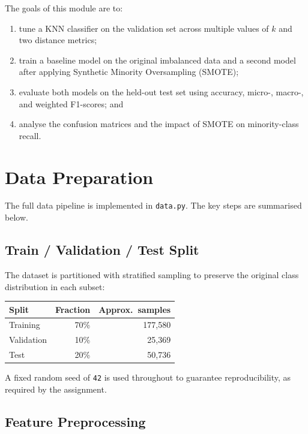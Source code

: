 \documentclass[12pt,a4paper]{article}
\begin{document}
The goals of this module are to:
\begin{enumerate}[label=(\roman*)]
  \item tune a KNN classifier on the validation set across multiple values of $k$ and
        two distance metrics;
  \item train a baseline model on the original imbalanced data and a second model after
        applying Synthetic Minority Oversampling (SMOTE);
  \item evaluate both models on the held-out test set using accuracy, micro-, macro-,
        and weighted F1-scores; and
  \item analyse the confusion matrices and the impact of SMOTE on minority-class recall.
\end{enumerate}

\section{Data Preparation}

The full data pipeline is implemented in \texttt{data.py}. The key steps are
summarised below.

\subsection{Train / Validation / Test Split}

The dataset is partitioned with stratified sampling to preserve the original
class distribution in each subset:

\begin{center}
\begin{tabular}{lrr}
  \toprule
  \textbf{Split} & \textbf{Fraction} & \textbf{Approx.\ samples} \\
  \midrule
  Training   & 70\% & 177{,}580 \\
  Validation & 10\% & 25{,}369  \\
  Test       & 20\% & 50{,}736  \\
  \bottomrule
\end{tabular}
\end{center}

A fixed random seed of \texttt{42} is used throughout to guarantee
reproducibility, as required by the assignment.

\subsection{Feature Preprocessing}
\end{document}
